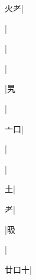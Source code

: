 \begin{multicols}{2}
{{\cjk{}{\cnsym{}　}火耂}|{}\par
{}|{}\par
{\cjk{}{\cnsym{}　}{\cnsym{}　}{\cnsym{}　}}|{}\par
{\cjk{}{\cnsym{}　}{\cnsym{}　}{\cnsym{}　}}|{}\par
{\cjk{}{\cnsym{}　}{\cnsym{}　}{\cnsym{}　}}|{\cjk{}旯}\par
{\cjk{}{\cnsym{}　}{\cnsym{}　}{\cnsym{}　}}|{}\par
{\cjk{}{\cnsym{}　}亠口}|{}\par
{\cjk{}{\cnsym{}　}{\cnsym{}　}{\cnsym{}　}}|{}\par
{\cjk{}{\cnsym{}　}{\cnsym{}　}{\cnsym{}　}}|{}\par
{\cjk{}{\cnsym{}　}{\cnsym{}　}土}|{}\par
{耂}|{}\par
{\cjk{}{\cnsym{}　}{\cnsym{}　}{\cnsym{}　}}|{\cjk{}昅}\par
{\cjk{}{\cnsym{}　}{\cnsym{}　}{\cnsym{}　}}|{}\par
{\cjk{}廿口十}|{}\par
}
\end{multicols}
